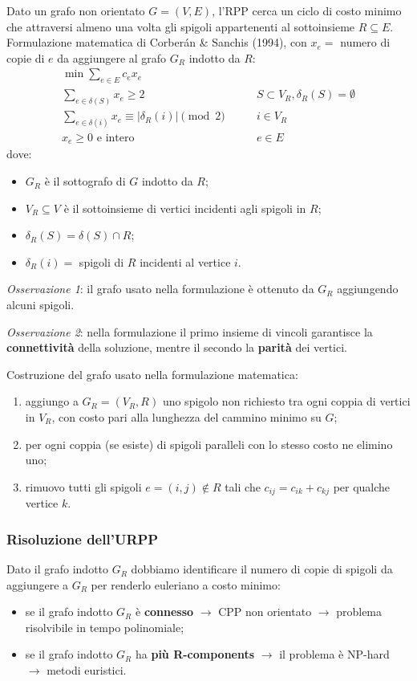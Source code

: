 Dato un grafo non orientato $G=(V,E)$, l'RPP cerca un ciclo di costo minimo che attraversi almeno una volta gli spigoli appartenenti al sottoinsieme $R\subseteq E$. Formulazione matematica di Corberán \& Sanchis (1994), con $x_e=$ numero di copie di $e$ da aggiungere al grafo $G_R$ indotto da $R$:
\begin{equation*}
	\begin{aligned}
		\min \sum_{e\in E}c_ex_e\\
		\sum_{e\in \delta (S)}x_e \ge 2 \quad & \quad S\subset V_R, \delta_R(S)=\emptyset\\
		\sum_{e\in \delta (i)}x_e \equiv |\delta_R(i)| \pmod 2 \quad & \quad i \in V_R\\
		x_e\ge 0 \textrm{ e intero} \quad & \quad e\in E
	\end{aligned}
\end{equation*}
dove:
\begin{itemize}
	\item $G_R$ è il sottografo di $G$ indotto da $R$;
	\item $V_R\subseteq V$ è il sottoinsieme di vertici incidenti agli spigoli in $R$;
	\item $\delta_R(S)=\delta (S)\cap R$;
	\item $\delta_R(i)=$ spigoli di $R$ incidenti al vertice $i$.
\end{itemize}
\textit{Osservazione 1}: il grafo usato nella formulazione è ottenuto da $G_R$ aggiungendo alcuni spigoli.

\textit{Osservazione 2}: nella formulazione il primo insieme di vincoli garantisce la \textbf{connettività} della soluzione, mentre il secondo la \textbf{parità} dei vertici.

Costruzione del grafo usato nella formulazione matematica:
\begin{enumerate}
	\item aggiungo a $G_R=(V_R,R)$ uno spigolo non richiesto tra ogni coppia di vertici in $V_R$, con costo pari alla lunghezza del cammino minimo su $G$;
	\item per ogni coppia (se esiste) di spigoli paralleli con lo stesso costo ne elimino uno;
	\item rimuovo tutti gli spigoli $e=(i,j)\notin R$ tali che $c_{ij}=c_{ik}+c_{kj}$ per qualche vertice $k$.
\end{enumerate}

\subsubsection*{Risoluzione dell'URPP}
Dato il grafo indotto $G_R$ dobbiamo identificare il numero di copie di spigoli da aggiungere a $G_R$ per renderlo euleriano a costo minimo:
\begin{itemize}
	\item se il grafo indotto $G_R$ è \textbf{connesso} $\rightarrow$ CPP non orientato $\rightarrow$ problema risolvibile in tempo polinomiale;
	\item se il grafo indotto $G_R$ ha \textbf{più R-components} $\rightarrow$ il problema è NP-hard $\rightarrow$ metodi euristici.
\end{itemize}

